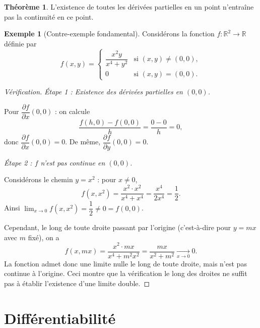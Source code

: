 \documentclass[12pt,a4paper,openany]{book}
\theoremstyle{definition}
\newtheorem{theoreme}{Théorème}[chapter]
\newtheorem{exemple}{Exemple}[chapter]
\newcommand{\R}{\mathbb{R}}
\begin{document}
\begin{theoreme}
  \label{thm:partials-not-continuity}
  L'existence de toutes les dérivées partielles en un point n'entraîne pas la continuité en ce point.
\end{theoreme}

\begin{exemple}[Contre-exemple fondamental]
  \label{ex:partials-not-continuity}
  Considérons la fonction $f \colon \R^2 \to \R$ définie par
  \[
    f(x,y) = \begin{cases}
      \dfrac{x^2 y}{x^4 + y^2} & \text{si } (x,y) \neq (0,0), \\[6pt]
      0 & \text{si } (x,y) = (0,0).
    \end{cases}
  \]
\end{exemple}

\begin{proof}[Vérification]
  \emph{Étape 1 : Existence des dérivées partielles en $(0,0)$.}

  Pour $\dfrac{\partial f}{\partial x}(0,0)$ : on calcule
  \[
    \frac{f(h,0) - f(0,0)}{h} = \frac{0 - 0}{h} = 0,
  \]
  donc $\dfrac{\partial f}{\partial x}(0,0) = 0$. De même, $\dfrac{\partial f}{\partial y}(0,0) = 0$.

  \emph{Étape 2 : $f$ n'est pas continue en $(0,0)$.}

  Considérons le chemin $y = x^2$ : pour $x \neq 0$,
  \[
    f(x, x^2) = \frac{x^2 \cdot x^2}{x^4 + x^4} = \frac{x^4}{2x^4} = \frac{1}{2}.
  \]
  Ainsi $\lim_{x \to 0} f(x, x^2) = \dfrac{1}{2} \neq 0 = f(0,0)$.

  Cependant, le long de toute droite passant par l'origine (c'est-à-dire pour $y = mx$ avec $m$ fixé), on a
  \[
    f(x, mx) = \frac{x^2 \cdot mx}{x^4 + m^2 x^2} = \frac{mx}{x^2 + m^2} \xrightarrow[x \to 0]{} 0.
  \]
  La fonction admet donc une limite nulle le long de toute droite, mais n'est pas continue à l'origine. Ceci montre que la vérification le long des droites ne suffit pas à établir l'existence d'une limite double.
\end{proof}

\section{Différentiabilité}
\label{sec:differentiabilite}
\end{document}
